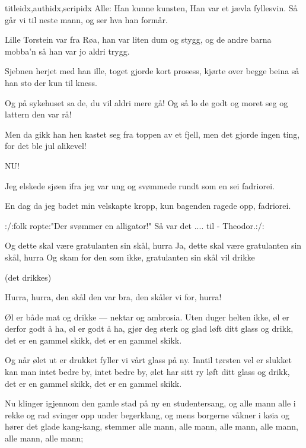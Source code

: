 \documentclass[14pt,letterpaper,norsk]{article}
\begin{document}
\begin{songs}{titleidx,authidx,scripidx}
\beginverse
Alle: Han kunne kunsten,
Han var et jævla fyllesvin.
Så går vi til neste mann, og
ser hva han formår.
\endverse
\endsong


\beginverse
Lille Torstein var fra Røa,
han var liten dum og stygg,
og de andre barna mobba'n så
han var jo aldri trygg.
\endverse

\beginverse
Sjebnen herjet med han ille,
toget gjorde kort prosess,
kjørte over begge beina
så han sto der kun til kness.
\endverse

\beginverse
Og på sykehuset sa de,
du vil aldri mere gå!
Og så lo de godt og moret seg
og lattern den var rå!
\endverse

\beginverse
Men da gikk han hen kastet seg
fra toppen av et fjell,
men det gjorde ingen ting,
for det ble jul alikevel!
\endverse
\endsong

\beginverse
NU!
\endverse
\endsong

\beginverse
Jeg elskede sjøen ifra jeg var ung
og svømmede rundt som en sei
fadriorei.
\endverse

\beginverse
En dag da jeg badet min velskapte kropp,
kun bagenden ragede opp,
fadriorei.
\endverse

\beginverse
:/:folk ropte:"Der svømmer en alligator!"
Så var det .... til - Theodor.:/:
\endverse
\endsong

\beginverse
Og dette skal være gratulanten sin skål, hurra
Ja, dette skal være gratulanten sin skål, hurra
Og skam for den som ikke, gratulanten sin skål vil drikke

(det drikkes)

Hurra, hurra, den skål den var bra, den skåler vi for, hurra!
\endverse
\endsong

\beginverse
Øl er både mat og drikke --- nektar og ambrosia.
Uten duger helten ikke, øl er derfor godt å ha,
øl er godt å ha, gjør deg sterk og glad
løft ditt glass og drikk, det er en gammel skikk,
det er en gammel skikk.
\endverse

\beginverse
Og når ølet ut er drukket fyller vi vårt glass på ny.
Inntil tørsten vel er slukket kan man intet bedre by,
intet bedre by, ølet har sitt ry
løft ditt glass og drikk, det er en gammel skikk,
det er en gammel skikk.
\endverse
\endsong

\beginverse
Nu klinger igjennom den gamle stad på ny en studentersang,
og alle mann alle i rekke og rad svinger opp under begerklang,
og mens borgerne våkner i køia og hører det glade kang-kang,
stemmer alle mann, alle mann, alle mann, alle mann, alle mann, alle mann;
\endverse


\end{songs}
\end{document}
